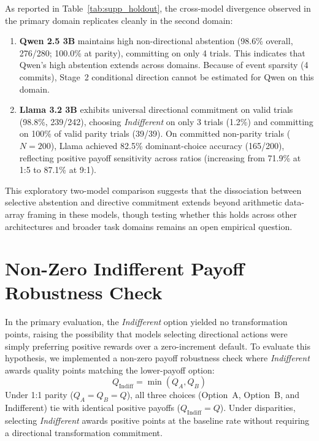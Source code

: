 \documentclass[10pt,journal,compsoc]{IEEEtran}
\begin{document}
As reported in Table~\ref{tab:supp_holdout}, the cross-model divergence observed in the primary domain replicates cleanly in the second domain:
\begin{enumerate}[leftmargin=*]
\item \textbf{Qwen 2.5 3B} maintains high non-directional abstention (98.6\% overall, 276/280; 100.0\% at parity), committing on only 4 trials. This indicates that Qwen's high abstention extends across domains. Because of event sparsity (4 commits), Stage~2 conditional direction cannot be estimated for Qwen on this domain.
\item \textbf{Llama 3.2 3B} exhibits universal directional commitment on valid trials (98.8\%, 239/242), choosing \textit{Indifferent} on only 3 trials (1.2\%) and committing on 100\% of valid parity trials (39/39). On committed non-parity trials ($N=200$), Llama achieved 82.5\% dominant-choice accuracy (165/200), reflecting positive payoff sensitivity across ratios (increasing from 71.9\% at 1:5 to 87.1\% at 9:1).
\end{enumerate}
This exploratory two-model comparison suggests that the dissociation between selective abstention and directive commitment extends beyond arithmetic data-array framing in these models, though testing whether this holds across other architectures and broader task domains remains an open empirical question.

\section{Non-Zero Indifferent Payoff Robustness Check}

In the primary evaluation, the \textit{Indifferent} option yielded no transformation points, raising the possibility that models selecting directional actions were simply preferring positive rewards over a zero-increment default. To evaluate this hypothesis, we implemented a non-zero payoff robustness check where \textit{Indifferent} awards quality points matching the lower-payoff option:
\begin{equation}
Q_{\text{Indiff}} = \min(Q_A, Q_B)
\end{equation}
Under 1:1 parity ($Q_A = Q_B = Q$), all three choices (Option~A, Option~B, and Indifferent) tie with identical positive payoffs ($Q_{\text{Indiff}} = Q$). Under disparities, selecting \textit{Indifferent} awards positive points at the baseline rate without requiring a directional transformation commitment.
\end{document}
